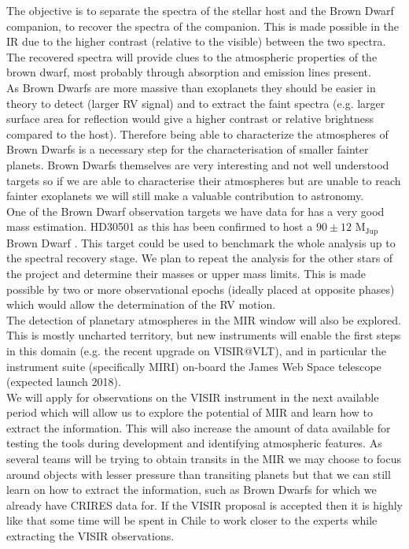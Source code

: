 \documentclass[pdftex,12pt,a4paper]{article}
\begin{document}
The objective is to separate the spectra of the stellar host and the Brown Dwarf companion, to recover the spectra of the companion. This is made possible in the IR due to the higher contrast (relative to the visible) between the two spectra. The recovered spectra will provide clues to the atmospheric properties of the brown dwarf, most probably through absorption and emission lines present. \\

As Brown Dwarfs are more massive than exoplanets they should be easier in theory to detect (larger {RV} signal) and to extract the faint spectra (e.g. larger surface area for reflection would give a higher contrast or relative brightness compared to the host). Therefore being able to characterize the atmospheres of Brown Dwarfs is a necessary step for the characterisation of smaller fainter planets. Brown Dwarfs themselves are very interesting and not well understood targets so if we are able to characterise their atmospheres but are unable to reach fainter exoplanets we will still make a valuable contribution to astronomy. \\

One of the Brown Dwarf observation targets we have data for has a very good mass estimation. HD30501 as this has been confirmed to host a $90\pm12$ M$_{\textrm{Jup}}$ Brown Dwarf \citep{Sahlmann2011}. This target could be used to benchmark the whole analysis up to the spectral recovery stage. We plan to repeat the analysis for the other stars of the project and determine their masses or upper mass limits. This is made possible by two or more observational epochs (ideally placed at opposite phases) which would allow the determination of the {RV} motion. \\

The detection of planetary atmospheres in the MIR window will also be explored. This is mostly uncharted territory, but new instruments will enable the first steps in this domain (e.g. the recent upgrade on VISIR@VLT), and in particular the instrument suite (specifically MIRI) on-board the James Web Space telescope (expected launch 2018). \\

We will apply for observations on the VISIR instrument in the next available period which will allow us to explore the potential of MIR and learn how to extract the information. This will also increase the amount of data available for testing the tools during development and identifying atmospheric features. As several teams will be trying to obtain transits in the MIR we may choose to focus around objects with lesser pressure than transiting planets but that we can still learn on how to extract the information, such as Brown Dwarfs for which we already have CRIRES data for. If the VISIR proposal is accepted then it is highly like that some time will be spent in Chile to work closer to the experts while extracting the VISIR observations.\\
\end{document}
